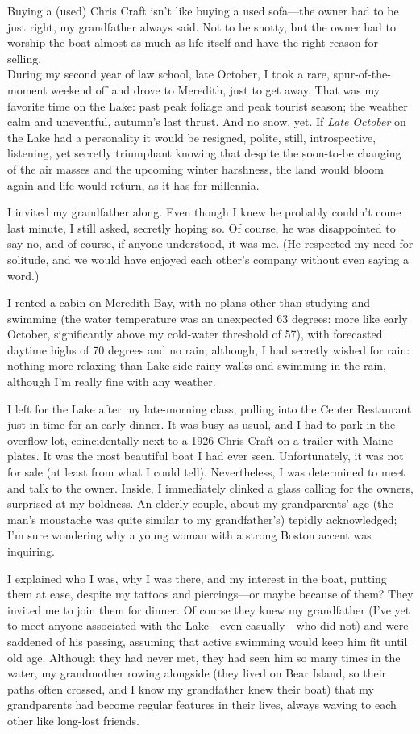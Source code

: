 Buying a (used) Chris Craft isn't like buying a used sofa---the owner
had to be just right, my grandfather always said. Not to be snotty, but
the owner had to worship the boat almost as much as life itself and have
the right reason for selling.\\

During my second year of law school, late October, I took a rare,
spur-of-the-moment weekend off and drove to Meredith, just to get away.
That was my favorite time on the Lake: past peak foliage and peak
tourist season; the weather calm and uneventful, autumn's last thrust.
And no snow, yet. If \emph{Late October} on the Lake had a personality
it would be resigned, polite, still, introspective, listening, yet
secretly triumphant knowing that despite the soon-to-be changing of the
air masses and the upcoming winter harshness, the land would bloom again
and life would return, as it has for millennia.

I invited my grandfather along. Even though I knew he probably couldn't
come last minute, I still asked, secretly hoping so. Of course, he was
disappointed to say no, and of course, if anyone understood, it was me.
(He respected my need for solitude, and we would have enjoyed each
other's company without even saying a word.)

I rented a cabin on Meredith Bay, with no plans other than studying and
swimming (the water temperature was an unexpected 63 degrees: more like
early October, significantly above my cold-water threshold of 57), with
forecasted daytime highs of 70 degrees and no rain; although, I had
secretly wished for rain: nothing more relaxing than Lake-side rainy
walks and swimming in the rain, although I'm really fine with any
weather.

I left for the Lake after my late-morning class, pulling into the Center
Restaurant just in time for an early dinner. It was busy as usual, and I
had to park in the overflow lot, coincidentally next to a 1926 Chris
Craft on a trailer with Maine plates. It was the most beautiful boat I
had ever seen. Unfortunately, it was not for sale (at least from what I
could tell). Nevertheless, I was determined to meet and talk to the
owner. Inside, I immediately clinked a glass calling for the owners,
surprised at my boldness. An elderly couple, about my grandparents' age
(the man's moustache was quite similar to my grandfather's) tepidly
acknowledged; I'm sure wondering why a young woman with a strong Boston
accent was inquiring.

I explained who I was, why I was there, and my interest in the boat,
putting them at ease, despite my tattoos and piercings---or maybe
because of them? They invited me to join them for dinner. Of course they
knew my grandfather (I've yet to meet anyone associated with the
Lake---even casually---who did not) and were saddened of his passing,
assuming that active swimming would keep him fit until old age. Although
they had never met, they had seen him so many times in the water, my
grandmother rowing alongside (they lived on Bear Island, so their paths
often crossed, and I know my grandfather knew their boat) that my
grandparents had become regular features in their lives, always waving
to each other like long-lost friends.

